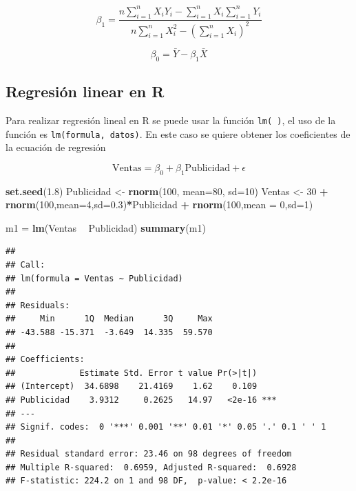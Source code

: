 \documentclass[letterpaper,]{book}
\newenvironment{Shaded}{\begin{snugshade}}{\end{snugshade}}
\newcommand{\DataTypeTok}[1]{\textcolor[rgb]{0.13,0.29,0.53}{#1}}
\newcommand{\DecValTok}[1]{\textcolor[rgb]{0.00,0.00,0.81}{#1}}
\newcommand{\FloatTok}[1]{\textcolor[rgb]{0.00,0.00,0.81}{#1}}
\newcommand{\KeywordTok}[1]{\textcolor[rgb]{0.13,0.29,0.53}{\textbf{#1}}}
\newcommand{\NormalTok}[1]{#1}
\newcommand{\OperatorTok}[1]{\textcolor[rgb]{0.81,0.36,0.00}{\textbf{#1}}}
\newcommand{\StringTok}[1]{\textcolor[rgb]{0.31,0.60,0.02}{#1}}
\begin{document}
\begin{equation}
\beta_1 = \dfrac{n\sum_{i=1}^{n}{X_iY_i}-\sum_{i=1}^{n}{X_i}\sum_{i=1}^{n}{Y_i}}{n\sum_{i=1}^{n}{X_i^2}-\left(\sum_{i=1}^{n}{X_i}\right)^2}
    \label{eq:pendiente}
\end{equation}

\begin{equation}
\beta_0 = \bar{Y}-\beta_1\bar{X}
    \label{eq:inter}
\end{equation}

\hypertarget{regresion-linear-en-r}{%
\subsection{Regresión linear en R}\label{regresion-linear-en-r}}

Para realizar regresión lineal en R se puede usar la función \texttt{lm(\ )}, el uso de la función es \texttt{lm(formula,\ datos)}. En este caso se quiere obtener los coeficientes de la ecuación de regresión

\begin{equation}
  \text{Ventas} = \beta_0 + \beta_1 \text{Publicidad} + \epsilon
    \label{eq:modelo0}
\end{equation}

\begin{Shaded}
\begin{Highlighting}[]
\KeywordTok{set.seed}\NormalTok{(}\FloatTok{1.8}\NormalTok{)}
\NormalTok{Publicidad <-}\StringTok{ }\KeywordTok{rnorm}\NormalTok{(}\DecValTok{100}\NormalTok{, }\DataTypeTok{mean=}\DecValTok{80}\NormalTok{, }\DataTypeTok{sd=}\DecValTok{10}\NormalTok{)}
\NormalTok{Ventas <-}\StringTok{ }\DecValTok{30} \OperatorTok{+}\StringTok{ }\KeywordTok{rnorm}\NormalTok{(}\DecValTok{100}\NormalTok{,}\DataTypeTok{mean=}\DecValTok{4}\NormalTok{,}\DataTypeTok{sd=}\FloatTok{0.3}\NormalTok{)}\OperatorTok{*}\NormalTok{Publicidad }\OperatorTok{+}\StringTok{ }\KeywordTok{rnorm}\NormalTok{(}\DecValTok{100}\NormalTok{,}\DataTypeTok{mean =} \DecValTok{0}\NormalTok{,}\DataTypeTok{sd=}\DecValTok{1}\NormalTok{)}

\NormalTok{m1 =}\StringTok{ }\KeywordTok{lm}\NormalTok{(Ventas }\OperatorTok{~}\StringTok{ }\NormalTok{Publicidad)}
\KeywordTok{summary}\NormalTok{(m1)}
\end{Highlighting}
\end{Shaded}

\begin{verbatim}
## 
## Call:
## lm(formula = Ventas ~ Publicidad)
## 
## Residuals:
##     Min      1Q  Median      3Q     Max 
## -43.588 -15.371  -3.649  14.335  59.570 
## 
## Coefficients:
##             Estimate Std. Error t value Pr(>|t|)    
## (Intercept)  34.6898    21.4169    1.62    0.109    
## Publicidad    3.9312     0.2625   14.97   <2e-16 ***
## ---
## Signif. codes:  0 '***' 0.001 '**' 0.01 '*' 0.05 '.' 0.1 ' ' 1
## 
## Residual standard error: 23.46 on 98 degrees of freedom
## Multiple R-squared:  0.6959, Adjusted R-squared:  0.6928 
## F-statistic: 224.2 on 1 and 98 DF,  p-value: < 2.2e-16
\end{verbatim}
\end{document}
